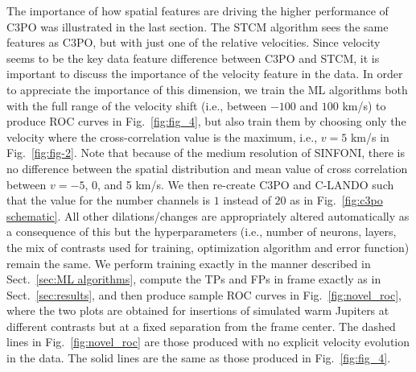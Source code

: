 \documentclass{aa}
\begin{document}
The importance of how spatial features are driving the higher performance of C3PO was illustrated in the last section. The STCM algorithm sees the same features as C3PO, but with just one of the relative velocities.
Since velocity seems to be the key data feature difference between C3PO and STCM, it is important to discuss the importance of the velocity feature in the data. 
In order to appreciate the importance of this dimension, we train the ML algorithms both with the full range of the velocity shift (i.e., between $-100$ and $100$ km/s) to produce ROC curves in Fig.~\ref{fig:fig_4}, but also train them by choosing only the velocity where the cross-correlation value is the maximum, i.e., $v=5$ km/s in Fig.~\ref{fig:fig-2}.
Note that because of the medium resolution of SINFONI, there is no difference between the spatial distribution and mean value of cross correlation between $v=-5$, 0, and 5 km/s. 
We then re-create C3PO and C-LANDO such that the value for the number channels is $1$ instead of $20$ as in Fig.~\ref{fig:c3po schematic}.
All other dilations/changes are appropriately altered automatically as a consequence of this but the hyperparameters (i.e., number of neurons, layers, the mix of contrasts used for training, optimization algorithm and error function) remain the same.
We perform training exactly in the manner described in Sect.~\ref{sec:ML algorithms}, compute the TPs and FPs in frame exactly as in Sect.~\ref{sec:results}, and then produce sample ROC curves in Fig.~\ref{fig:novel_roc}, where the two plots are obtained for insertions of simulated warm Jupiters at different contrasts but at a fixed separation from the frame center.
The dashed lines in Fig.~\ref{fig:novel_roc} are those produced with no explicit velocity evolution in the data.
The solid lines are the same as those produced in Fig.~\ref{fig:fig_4}.
\end{document}
